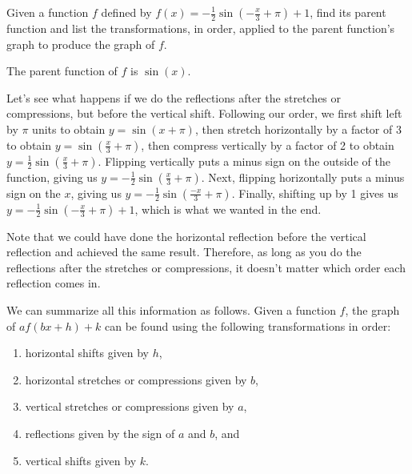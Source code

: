 \documentclass[handout, noauthor, nooutcomes]{ximera}
\begin{document}
\begin{example}
Given a function $f$ defined by $f(x) = -\frac{1}{2}\sin\left(-\frac{x}{3} + \pi\right) + 1$, find its parent function and list the transformations, in order, applied to the parent function's graph to produce the graph of $f$. 
\begin{explanation}
The parent function of $f$ is $\sin(x)$. 

Let's see what happens if we do the reflections after the stretches or compressions, but before the vertical shift. Following our order, we first shift left by $\pi$ units to obtain $y = \sin(x + \pi)$, then stretch horizontally by a factor of 3 to obtain $y = \sin\left(\frac{x}{3} + \pi \right)$, then compress vertically by a factor of 2 to obtain $y = \frac{1}{2}\sin\left(\frac{x}{3} + \pi \right)$. Flipping vertically puts a minus sign on the outside of the function, giving us $y = - \frac{1}{2}\sin\left(\frac{x}{3} + \pi \right)$. Next, flipping horizontally puts a minus sign on the $x$, giving us $y = - \frac{1}{2}\sin\left(\frac{-x}{3} + \pi \right)$. Finally, shifting up by 1 gives us $y = - \frac{1}{2}\sin\left(-\frac{x}{3} + \pi \right) + 1$, which is what we wanted in the end.

Note that we could have done the horizontal reflection before the vertical reflection and achieved the same result. Therefore, as long as you do the reflections after the stretches or compressions, it doesn't matter which order each reflection comes in. 
\end{explanation}
\end{example}

We can summarize all this information as follows. Given a function $f$, the graph of $af(bx + h) + k$ can be found using the following transformations in order:
\begin{enumerate}
\item horizontal shifts given by $h$,
\item horizontal stretches or compressions given by $b$,
\item vertical stretches or compressions given by $a$,
\item reflections given by the sign of $a$ and $b$, and
\item vertical shifts given by $k$.
\end{enumerate}
\end{document}
